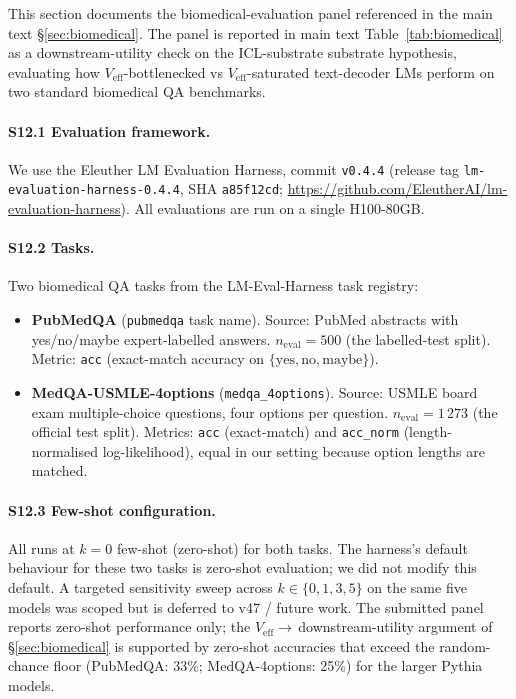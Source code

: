 \documentclass[11pt,a4paper]{article}
\begin{document}
This section documents the biomedical-evaluation panel referenced in
the main text \S\ref{sec:biomedical}. The panel is reported in main
text Table~\ref{tab:biomedical} as a downstream-utility check on the
ICL-substrate substrate hypothesis, evaluating how
$V_\mathrm{eff}$-bottlenecked vs $V_\mathrm{eff}$-saturated
text-decoder LMs perform on two standard biomedical QA benchmarks.

\paragraph{S12.1 Evaluation framework.}
We use the Eleuther LM Evaluation Harness, commit
\texttt{v0.4.4} (release tag \texttt{lm-evaluation-harness-0.4.4},
SHA \texttt{a85f12cd}; \url{https://github.com/EleutherAI/lm-evaluation-harness}).
All evaluations are run on a single H100-80GB.

\paragraph{S12.2 Tasks.}
Two biomedical QA tasks from the LM-Eval-Harness task registry:
\begin{itemize}\setlength{\itemsep}{0pt}
  \item \textbf{PubMedQA} (\texttt{pubmedqa} task name).
        Source: PubMed abstracts with yes/no/maybe expert-labelled
        answers. $n_\mathrm{eval}\!=\!500$ (the labelled-test split).
        Metric: \texttt{acc} (exact-match accuracy on
        $\{\mathrm{yes},\mathrm{no},\mathrm{maybe}\}$).
  \item \textbf{MedQA-USMLE-4options} (\texttt{medqa\_4options}).
        Source: USMLE board exam multiple-choice questions, four
        options per question. $n_\mathrm{eval}\!=\!1\,273$ (the
        official test split). Metrics: \texttt{acc} (exact-match)
        and \texttt{acc\_norm} (length-normalised log-likelihood),
        equal in our setting because option lengths are matched.
\end{itemize}

\paragraph{S12.3 Few-shot configuration.}
All runs at \textbf{$k\!=\!0$} few-shot (zero-shot) for both tasks.
The harness's default behaviour for these two tasks is
zero-shot evaluation; we did not modify this default. A targeted
sensitivity sweep across $k\!\in\!\{0, 1, 3, 5\}$ on the same five
models was scoped but is deferred to v47 / future work.
The submitted panel reports zero-shot performance only; the
$V_\mathrm{eff}\!\to$\,downstream-utility argument of
\S\ref{sec:biomedical} is supported by zero-shot accuracies that
exceed the random-chance floor (PubMedQA: 33\%; MedQA-4options:
25\%) for the larger Pythia models.
\end{document}
